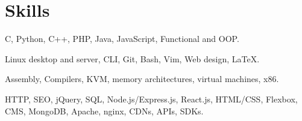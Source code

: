 \section{Skills}
{C, Python, C++, PHP, Java, JavaScript, Functional and OOP.}

{Linux desktop and server, CLI, Git, Bash, Vim, Web design, {\LaTeX}.}

{Assembly, Compilers, KVM, memory architectures, virtual machines, x86.}

{HTTP, SEO, jQuery, SQL, Node.js/Express.js, React.js, HTML/CSS, Flexbox, CMS, MongoDB, Apache, nginx, CDNs, APIs, SDKs.}
